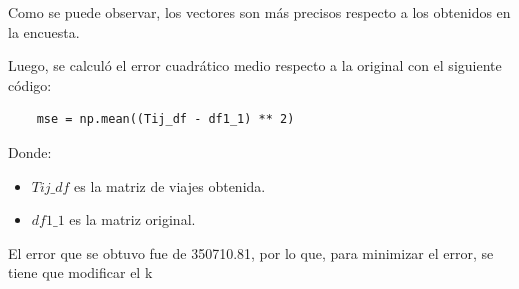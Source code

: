 \documentclass[letterpaper,12pt]{article}
\begin{document}
Como se puede observar, los vectores son más precisos respecto a los obtenidos en la encuesta.

Luego, se calculó el error cuadrático medio respecto a la original con el siguiente código:


\begin{lstlisting}
    mse = np.mean((Tij_df - df1_1) ** 2)
\end{lstlisting}

Donde:
\begin{itemize}
    \item $Tij\_df$ es la matriz de viajes obtenida.
    \item $df1\_1$ es la matriz original.
\end{itemize}

El error que se obtuvo fue de 350710.81, por lo que, para minimizar el error, se tiene que modificar el k
\end{document}
